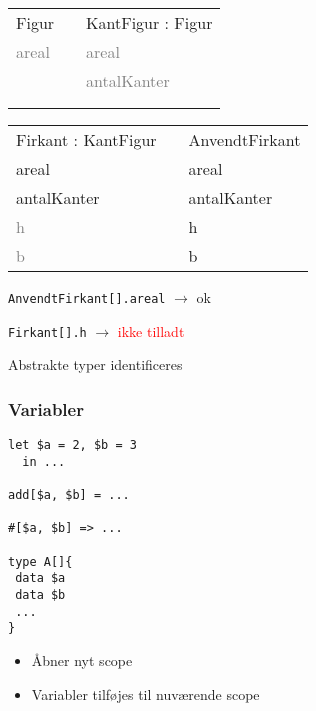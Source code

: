 \begin{frame}[fragile] 
\begin{table}[h]
\begin{tabular}{|l|l|l|}
 \cline{1-1} \cline{3-3} 
Figur          &  & KantFigur : Figur    \\ \cline{1-1} \cline{3-3} 
\textcolor{gray}{areal} &  & \textcolor{gray}{areal}       \\
               &  & \textcolor{gray}{antalKanter} \\
               &  &                      \\
               &  &                      \\ \cline{1-1} \cline{3-3} 
\end{tabular}
\end{table}
\begin{table}[h]
\begin{tabular}{|l|l|l|}
 \cline{1-1} \cline{3-3} 
Firkant : KantFigur &  & AnvendtFirkant       \\ \cline{1-1} \cline{3-3} 
areal               &  & areal                \\
antalKanter         &  & antalKanter          \\
\textcolor{gray}{h}          &  & h                    \\
\textcolor{gray}{b}          &  & b                    \\ \cline{1-1} \cline{3-3} 
\end{tabular}
\end{table}
\begin{center}
\texttt{AnvendtFirkant[].areal} $\rightarrow$ ok

\texttt{Firkant[].h} $\rightarrow$ \textcolor{red}{ikke tilladt}

Abstrakte typer identificeres
\end{center}
\end{frame}

\begin{frame}[fragile]
\frametitle{Variabler}
\begin{lstlisting}
let $a = 2, $b = 3 
  in ...

add[$a, $b] = ...

#[$a, $b] => ...

type A[]{
 data $a
 data $b
 ...
}
\end{lstlisting}
\begin{center}
\begin{itemize}                                  
\item Åbner nyt scope
\item Variabler tilføjes til nuværende scope
\end{itemize}
\end{center}
\end{frame}

